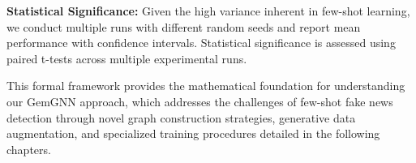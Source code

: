 \textbf{Statistical Significance:} Given the high variance inherent in few-shot learning, we conduct multiple runs with different random seeds and report mean performance with confidence intervals. Statistical significance is assessed using paired t-tests across multiple experimental runs.

This formal framework provides the mathematical foundation for understanding our GemGNN approach, which addresses the challenges of few-shot fake news detection through novel graph construction strategies, generative data augmentation, and specialized training procedures detailed in the following chapters.

\EndChapter
